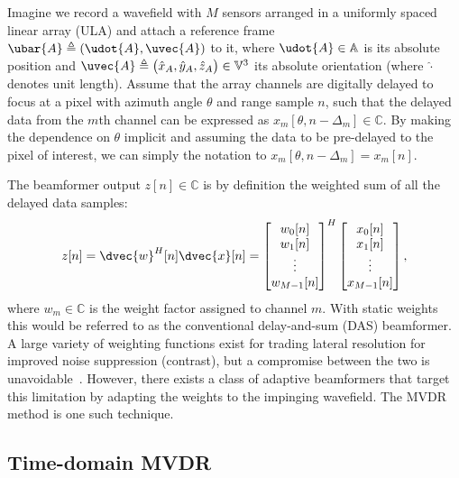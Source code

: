 {Imagine we record a wavefield with $M$ sensors arranged in a uniformly spaced linear array (ULA) and attach a reference frame $\ubar{A} \triangleq (\udot{A},\uvec{A})$ to it, where $\udot{A}\in\mathbb{A}$ is its absolute position and $\uvec{A}\triangleq\big(\hat{x}_{A},\hat{y}_{A},\hat{z}_{A}\big)\in\mathbb{V}^3$ its absolute orientation (where $\hat{\cdot}$ denotes unit length). Assume that the array channels are digitally delayed to focus at a pixel with azimuth angle $\theta$ and range sample $n$, such that the delayed data from the $m$th channel can be expressed as $x_m[\theta,n-\Delta_m]\in\mathbb{C}$. By making the dependence on $\theta$ implicit and assuming the data to be pre-delayed to the pixel of interest, we can simply the notation to $x_m[\theta,n-\Delta_m] = x_m[n]$. 

The beamformer output $z[n]\in\mathbb{C}$ is by definition the weighted sum of all the delayed data samples:
%
\begin{align}
z[n] = \dvec{w}^H[n]\dvec{x}[n] = \bmat{w_0[n]\\w_1[n]\\\vdots\\w_{M-1}[n]}^H \bmat{x_0[n]\\x_1[n]\\\vdots\\x_{M-1}[n]},\label{2_eq_z}
\end{align}
%
where $w_m\in\mathbb{C}$ is the weight factor assigned to channel $m$. With static weights this would be referred to as the conventional delay-and-sum (DAS) beamformer. A large variety of weighting functions exist for trading lateral resolution for improved noise suppression (contrast), but a compromise between the two is unavoidable~\cite{Harris1978}. However, there exists a class of adaptive beamformers that target this limitation by adapting the weights to the impinging wavefield. The MVDR method is one such technique.



\subsection{Time-domain MVDR}

}
